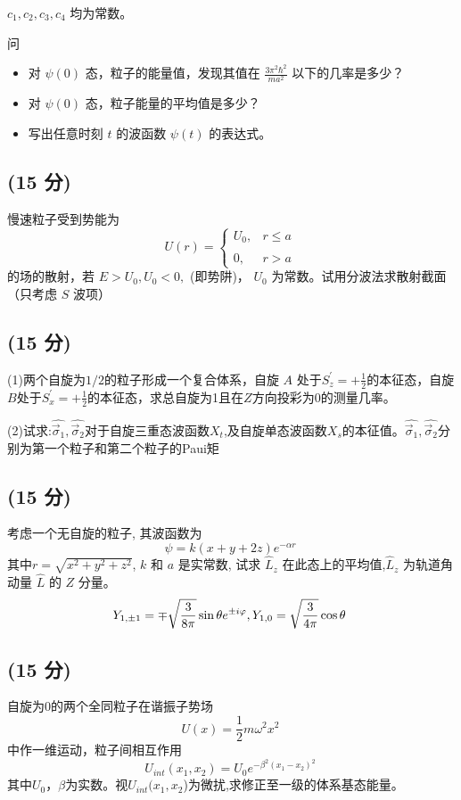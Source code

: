 \(c_1, c_2, c_3, c_4\) 均为常数。

问\begin{itemize}
  \item  对 \( \psi (0) \) 态，粒子的能量值，发现其值在 \( \frac{3\pi^2 \hbar^2}{ma^2} \) 以下的几率是多少？
  \item  对 \( \psi (0) \) 态，粒子能量的平均值是多少？
  \item  写出任意时刻 \( t \) 的波函数 \( \psi (t) \) 的表达式。
\end{itemize}
\subsection{(15 分)}
 慢速粒子受到势能为
\[U(r) = \begin{cases} U_0, & r \leq a \\\\0, & r > a \end{cases}~\]
的场的散射，若 $E > U_0, U_0 < 0,$ (即势阱)， $U_0$ 为常数。试用分波法求散射截面（只考虑 $S$ 波项）
\subsection{(15 分)}
(1)两个自旋为$1/2$的粒子形成一个复合体系，自旋 $A$ 处于$S^\prime_z =+\frac{1}{2}$的本征态，自旋$B$处于$S^\prime_x=+\frac{1}{2}$的本征态，求总自旋为1且在$Z$方向投彩为0的测量几率。

(2)试求:$\hat{\vec{\sigma}_1},\hat{\vec{\sigma}_2}$对于自旋三重态波函数$X_t$,及自旋单态波函数$X_s$的本征值。$\hat{\vec{\sigma}_1},\hat{\vec{\sigma}_2}$分别为第一个粒子和第二个粒子的Paui矩
\subsection{(15 分)}
考虑一个无自旋的粒子, 其波函数为
\[\psi = k (x + y + 2z) e^{-\alpha r}~\]
其中$r = \sqrt{x^2 + y^2 + z^2}$, $ k$ 和 $a$ 是实常数, 试求 $\hat{L}_z$ 在此态上的平均值,$\hat{L}_z$ 为轨道角动量 $\hat{L}$ 的 $Z$ 分量。
\[Y_{1, \pm 1} = \mp \sqrt{\frac{3}{8\pi}} \sin \theta e^{\pm i\varphi}, \\ Y_{1,0} = \sqrt{\frac{3}{4\pi}} \cos \theta~\]
\subsection{(15 分)}
自旋为0的两个全同粒子在谐振子势场
\[U(x)=\frac{1}{2}m\omega^2x^2~\]
中作一维运动，粒子间相互作用
\[U_{int}(x_1,x_2)=U_0e^{-\beta^2(x_1-x_2)^2}~\]
其中$U_0$，$\beta$为实数。视$U_{int}(x_1,x_2$)为微扰,求修正至一级的体系基态能量。